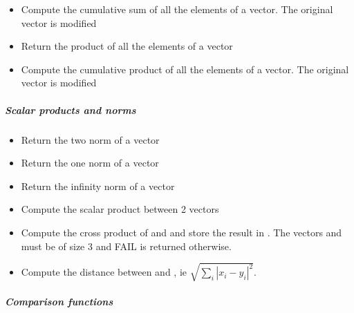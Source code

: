 \begin{itemize}
\item {}
  \sshortdescribe Compute the cumulative sum of all the elements of a
  vector. The original vector is modified

\item {}
  \sshortdescribe Return the product of all the elements of a vector  

\item {}
  \sshortdescribe Compute the cumulative product of all the elements of a
  vector. The original vector is modified
\end{itemize}

\subparagraph{Scalar products and norms}
\begin{itemize}
\item {}
  \sshortdescribe Return the two norm of a vector  

\item {}
  \sshortdescribe Return the one norm of a vector  

\item {}
  \sshortdescribe Return the infinity norm of a vector  

\item {} 
  \sshortdescribe Compute the scalar product between 2 vectors  
\item {}
  \sshortdescribe Compute the cross product of  and  and store the
  result in . The vectors  and  must be of size 3 and
  FAIL is returned otherwise.

\item {}
  \sshortdescribe Compute the distance between  and , ie
  $\sqrt{\sum_i |x_i - y_i|^2}$.

\end{itemize}

\subparagraph{Comparison functions}

